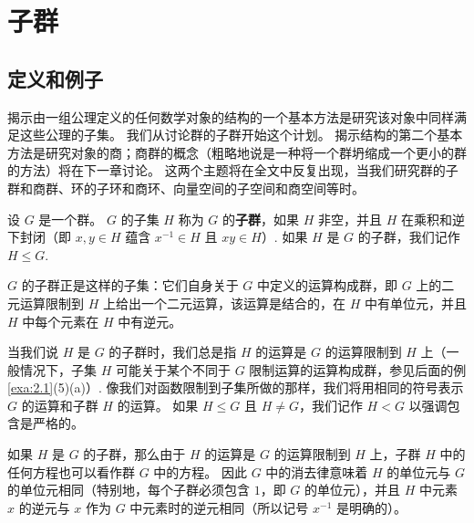 


\setcounter{chapter}{1}


\chapter{子群}

\section{定义和例子}

揭示由一组公理定义的任何数学对象的结构的一个基本方法是研究该对象中同样满足这些公理的子集。
我们从讨论群的子群开始这个计划。
揭示结构的第二个基本方法是研究对象的商；商群的概念（粗略地说是一种将一个群坍缩成一个更小的群的方法）将在下一章讨论。
这两个主题将在全文中反复出现，当我们研究群的子群和商群、环的子环和商环、向量空间的子空间和商空间等时。

\begin{definition}
设 \( G \) 是一个群。
\( G \) 的子集 \( H \) 称为 \( G \) 的\textbf{子群}，如果 \( H \) 非空，并且 \( H \) 在乘积和逆下封闭（即 \( x, y \in H \) 蕴含 \( x^{-1} \in H \) 且 \( xy \in H \)）. 
如果 \( H \) 是 \( G \) 的子群，我们记作 \( H \leq G \).
\end{definition}

\( G \) 的子群正是这样的子集：它们自身关于 \( G \) 中定义的运算构成群，即 \( G \) 上的二元运算限制到 \( H \) 上给出一个二元运算，该运算是结合的，在 \( H \) 中有单位元，并且 \( H \) 中每个元素在 \( H \) 中有逆元。

当我们说 \( H \) 是 \( G \) 的子群时，我们总是指 \( H \) 的运算是 \( G \) 的运算限制到 \( H \) 上（一般情况下，子集 \( H \) 可能关于某个不同于 \( G \) 限制运算的运算构成群，参见后面的例 \ref{exa:2.1}(5)(a)）. 
像我们对函数限制到子集所做的那样，我们将用相同的符号表示 \( G \) 的运算和子群 \( H \) 的运算。
如果 \( H \leq G \) 且 \( H \neq G \)，我们记作 \( H < G \) 以强调包含是严格的。

如果 \( H \) 是 \( G \) 的子群，那么由于 \( H \) 的运算是 \( G \) 的运算限制到 \( H \) 上，子群 \( H \) 中的任何方程也可以看作群 \( G \) 中的方程。
因此 \( G \) 中的消去律意味着 \( H \) 的单位元与 \( G \) 的单位元相同（特别地，每个子群必须包含 \( 1 \)，即 \( G \) 的单位元），并且 \( H \) 中元素 \( x \) 的逆元与 \( x \) 作为 \( G \) 中元素时的逆元相同（所以记号 \( x^{-1} \) 是明确的）。

